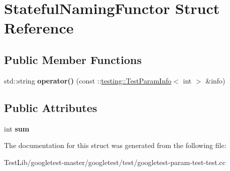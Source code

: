 \hypertarget{structStatefulNamingFunctor}{}\section{Stateful\+Naming\+Functor Struct Reference}
\label{structStatefulNamingFunctor}
\subsection*{Public Member Functions}
\begin{DoxyCompactItemize}
\item 
\mbox{\label{structStatefulNamingFunctor_a6a1d07c0b8314c1aee535f269ea536db}} 
std\+::string {\bfseries operator()} (const \+::\hyperlink{structtesting_1_1TestParamInfo}{testing\+::\+Test\+Param\+Info}$<$ int $>$ \&info)
\end{DoxyCompactItemize}
\subsection*{Public Attributes}
\begin{DoxyCompactItemize}
\item 
\mbox{\label{structStatefulNamingFunctor_a95887cf031d3113ae2edcd7617af3b79}} 
int {\bfseries sum}
\end{DoxyCompactItemize}


The documentation for this struct was generated from the following file\+:\begin{DoxyCompactItemize}
\item 
Test\+Lib/googletest-\/master/googletest/test/googletest-\/param-\/test-\/test.\+cc\end{DoxyCompactItemize}
